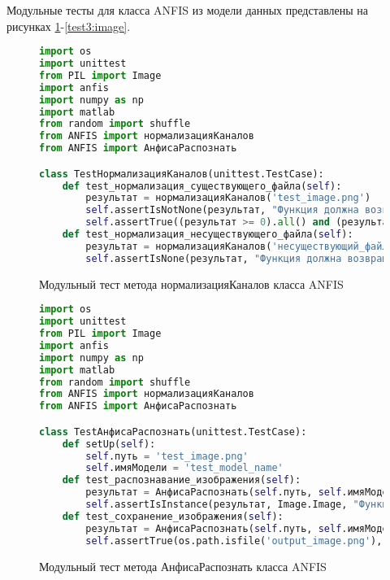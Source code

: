 Модульные тесты для класса ANFIS из модели данных представлены на рисунках \ref{test1:image}-\ref{test3:image}.

\begin{figure}[ht]
\begin{lstlisting}[language=Python]
import os
import unittest
from PIL import Image
import anfis
import numpy as np
import matlab
from random import shuffle
from ANFIS import нормализацияКаналов
from ANFIS import АнфисаРаспознать

class TestНормализацияКаналов(unittest.TestCase):
    def test_нормализация_существующего_файла(self):
        результат = нормализацияКаналов('test_image.png')
        self.assertIsNotNone(результат, "Функция должна возвращать не None для существующего файла")
        self.assertTrue((результат >= 0).all() and (результат <= 1).all(), "Все значения должны быть в диапазоне от 0 до 1")
    def test_нормализация_несуществующего_файла(self):
        результат = нормализацияКаналов('несуществующий_файл.jpg')
        self.assertIsNone(результат, "Функция должна возвращать None для несуществующего файла")
\end{lstlisting}  
\caption{Модульный тест метода нормализацияКаналов класса ANFIS}
\label{test1:image}
\end{figure}

\begin{figure}[ht]
\begin{lstlisting}[language=Python]
import os
import unittest
from PIL import Image
import anfis
import numpy as np
import matlab
from random import shuffle
from ANFIS import нормализацияКаналов
from ANFIS import АнфисаРаспознать

class TestАнфисаРаспознать(unittest.TestCase):
    def setUp(self):
        self.путь = 'test_image.png'
        self.имяМодели = 'test_model_name'
    def test_распознавание_изображения(self):
        результат = АнфисаРаспознать(self.путь, self.имяМодели)
        self.assertIsInstance(результат, Image.Image, "Функция должна возвращать объект изображения")
    def test_сохранение_изображения(self):
        результат = АнфисаРаспознать(self.путь, self.имяМодели)
        self.assertTrue(os.path.isfile('output_image.png'), "Файл изображения должен быть сохранён")
\end{lstlisting}  
\caption{Модульный тест метода АнфисаРаспознать класса ANFIS}
\label{test2:image}
\end{figure}

